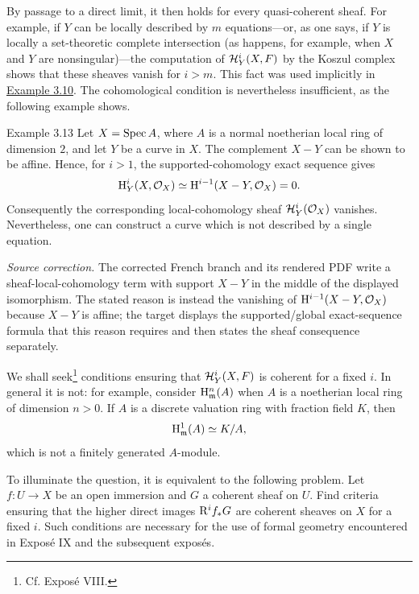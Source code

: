 By passage to a direct limit, it then holds for every quasi-coherent sheaf.
For example, if $Y$ can be locally described by $m$ equations---or, as one
says, if $Y$ is locally a set-theoretic complete intersection (as happens,
for example, when $X$ and $Y$ are nonsingular)---the computation of
$\mathcal H_Y^i(X,F)$ by the Koszul complex shows that these sheaves vanish for
$i>m$. This fact was used implicitly in \hyperref[III.3.10]{Example 3.10}. The cohomological
condition is nevertheless insufficient, as the following example shows.

\begin{sgastatement}{Example 3.13}
Let $X=\operatorname{Spec} A$, where $A$ is a normal noetherian local ring of dimension
$2$, and let $Y$ be a curve in $X$. The complement $X-Y$ can be shown to be
affine. Hence, for $i>1$, the supported-cohomology exact sequence gives
\[
  \mathrm H_Y^i(X,\mathcal O_X)
  \simeq \mathrm H^{i-1}(X-Y,\mathcal O_X)=0.
\]
Consequently the corresponding local-cohomology sheaf
$\mathcal H_Y^i(\mathcal O_X)$ vanishes. Nevertheless, one can construct a curve
which is not described by a single equation.
\end{sgastatement}

\noindent\textit{Source correction.} The corrected French branch and its
rendered PDF write a sheaf-local-cohomology term with support $X-Y$ in the
middle of the displayed isomorphism. The stated reason is instead the
vanishing of $\mathrm H^{i-1}(X-Y,\mathcal O_X)$ because $X-Y$ is affine; the
target displays the supported/global exact-sequence formula that this reason
requires and then states the sheaf consequence separately.

We shall seek\footnote{Cf. Expos\'e VIII.} conditions ensuring that
$\mathcal H_Y^i(X,F)$ is coherent for a fixed $i$. In general it is not: for
example, consider $\mathrm H_{\mathfrak m}^n(A)$ when $A$ is a noetherian local
ring of dimension $n>0$. If $A$ is a discrete valuation ring with fraction
field $K$, then
\[
  \mathrm H_{\mathfrak m}^1(A)\simeq K/A,
\]
which is not a finitely generated $A$-module.

To illuminate the question, it is equivalent to the following problem. Let
$f:U\to X$ be an open immersion and $G$ a coherent sheaf on $U$. Find
criteria ensuring that the higher direct images $\mathrm R^i f_*G$ are coherent
sheaves on $X$ for a fixed $i$. Such conditions are necessary for the use of
formal geometry encountered in Expos\'e IX and the subsequent expos\'es.
